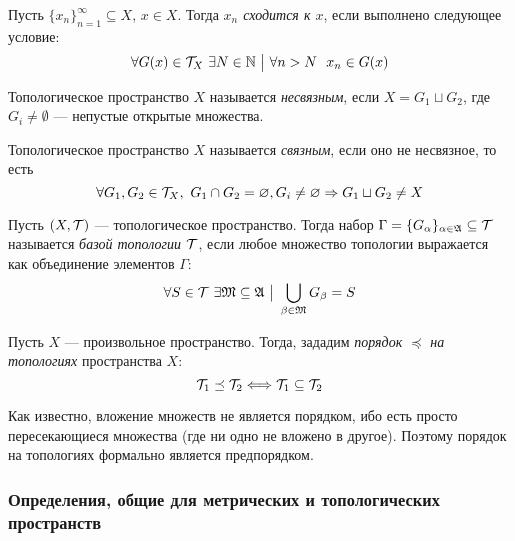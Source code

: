 %
%	

\begin{definition}
	Пусть $\{x_n\}_{n = 1}^\infty \subseteq X$, $x \in X$. Тогда \textit{$x_n$ сходится к $x$}, если выполнено следующее условие:
	\[
		\forall G(x) \in \mathcal{T}_X\ \exists N \in \mathbb{N} \ \big|\  \forall n > N\ \ x_n \in G(x)
	\]
\end{definition}

\begin{definition}
	Топологическое пространство $X$ называется \textit{несвязным}, если $X = G_1 \sqcup G_2$, где $G_i \neq \emptyset$ --- непустые открытые множества.
\end{definition}

\begin{definition}
	Топологическое пространство $X$ называется \textit{связным}, если оно не несвязное, то есть
	\[
		\forall G_1, G_2 \in \mathcal{T}_X,\ G_1 \cap G_2 = \varnothing, G_i \neq \varnothing \Rightarrow G_1 \sqcup G_2 \neq X 
	\]
\end{definition}

\begin{definition}
	Пусть $(X, \mathcal{T})$ --- топологическое пространство. Тогда набор $\Gamma = \{G_\alpha\}_{\alpha \in \mathfrak{A}} \subseteq \mathcal{T}$ называется \textit{базой топологии $\mathcal{T}$}, если любое множество топологии выражается как объединение элементов $\Gamma$:
	\[
		\forall S \in \mathcal{T}\ \exists \mathfrak{M} \subseteq \mathfrak{A} \ \big|\  \bigcup_{\beta \in \mathfrak{M}} G_\beta = S
	\]
\end{definition}

\begin{definition}
	Пусть $X$ --- произвольное пространство. Тогда, зададим \textit{порядок $\preceq$ на топологиях} пространства $X$:
	\[
		\mathcal{T}_1 \preceq \mathcal{T}_2 \Longleftrightarrow \mathcal{T}_1 \subseteq \mathcal{T}_2
	\]
\end{definition}

\begin{anote}
	Как известно, вложение множеств не является порядком, ибо есть просто пересекающиеся множества (где ни одно не вложено в другое). Поэтому порядок на топологиях формально является предпорядком.
\end{anote}

\subsubsection*{Определения, общие для метрических и топологических пространств}

